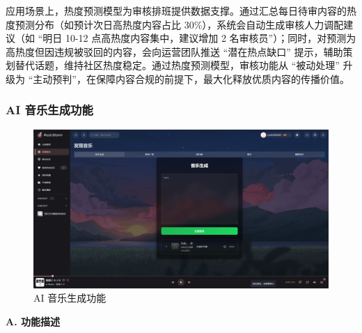 \documentclass{base}
\numberwithin{figure}{section} %
\begin{document}
应用场景上，热度预测模型为审核排班提供数据支撑。通过汇总每日待审内容的热度预测分布（如预计次日高热度内容占比 30\%），系统会自动生成审核人力调配建议（如 “明日 10-12 点高热度内容集中，建议增加 2 名审核员”）；同时，对预测为高热度但因违规被驳回的内容，会向运营团队推送 “潜在热点缺口” 提示，辅助策划替代话题，维持社区热度稳定。通过热度预测模型，审核功能从 “被动处理” 升级为 “主动预判”，在保障内容合规的前提下，最大化释放优质内容的传播价值。


\subsubsection{AI 音乐生成功能}

\begin{figure}[H]
    \centering
    \includegraphics[width=\textwidth]{images/7-2.png}
    \caption{AI 音乐生成功能}
    \label{fig:ai_music_generation}
\end{figure}

\textbf{A. 功能描述}
 
\end{document}
